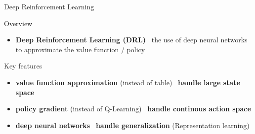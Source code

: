 \documentclass[presentation, 9pt]{beamer}\mode<presentation>{\usetheme{AMSBolognaFC}}
\begin{document}
\begin{frame}{Deep Reinforcement Learning}
	\centering
	\begin{block}{Overview}
		\begin{itemize}
			\item \textbf{Deep Reinforcement Learning (DRL)} \faArrowRight \, the use of deep neural networks to approximate the value function / policy
		\end{itemize}
	\end{block}
	
	\begin{alertblock}{Key features}
		\begin{itemize}
			\item \textbf{value function approximation} (instead of table) \faArrowRight \, \textbf{handle large state space}
			\item \textbf{policy gradient} (instead of Q-Learning) \faArrowRight \, \textbf{handle continous action space}
			\item \textbf{deep neural networks} \faArrowRight \, \textbf{handle generalization} (Representation learning)
		\end{itemize}
	\end{alertblock}
\end{frame}
\end{document}
